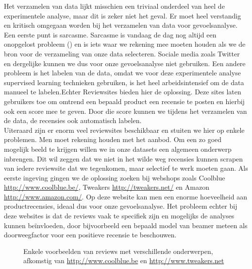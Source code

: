 Het verzamelen van data lijkt misschien een triviaal onderdeel van heel de experimentele analyse, maar dit is zeker niet het geval. Er moet heel verstandig en kritisch omgegaan worden bij het verzamelen van data voor gevoelsanalyse. Een eerste punt is sarcasme. Sarcasme is vandaag de dag nog altijd een onopgelost probleem (\cite{liebrecht2013perfect}) en is iets waar we rekening mee moeten houden als we de bron voor de verzameling van onze data selecteren. Sociale media zoals Twitter en dergelijke kunnen we dus voor onze gevoelsanalyse niet gebruiken. Een andere probleem is het labelen van de data, omdat we voor deze experimentele analyse supervised learning technieken gebruiken, is het heel arbeidsintensief om de data manueel te labelen.Echter Reviewsites bieden hier de oplossing. Deze sites laten gebruikers toe om omtrend een bepaald product een recensie te posten en hierbij ook een score mee te geven. Door die score kunnen we tijdens het verzamelen van de data, de recensies ook automatisch labelen.\\

Uiteraard zijn er enorm veel reviewsites beschikbaar en stuiten we hier op enkele problemen. Men moet rekening houden met het aanbod. Om een zo goed mogelijk beeld te krijgen willen we in onze datasets een algemeen onderwerp inbrengen. Dit wil zeggen dat we niet in het wilde weg recensies kunnen scrapen van iedere reviewsite dat we tegenkomen, maar selectief te werk moeten gaan. Als eerste ingeving gingen we de oplossing zoeken bij webshops zoals Coolblue \url{http://www.coolblue.be/}, Tweakers \url{http://tweakers.net/} en Amazon \url{http://www.amazon.com/}. Op deze website kan men een enorme hoeveelheid aan productrecensies, ideaal dus voor onze gevoelsanalyse. Het probleem echter bij deze websites is dat de reviews vaak te specifiek zijn en mogelijks de analyses kunnen be\"invloeden, door bijvoorbeeld een bepaald model van beamer meteen als doorweegfactor voor een positieve recensie te beschouwen.

\begin{figure}%
    \centering
    \caption{Enkele voorbeelden van reviews met verschillende onderwerpen, afkomstig van \url{http://www.coolblue.be} en \url{http://www.tweakers.net} }
\end{figure}


